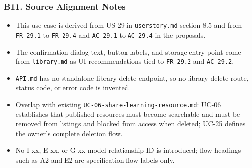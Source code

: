 \documentclass[12pt]{article}
\begin{document}
\hypertarget{sec:b11-source-alignment-notes}{}
\subsubsection*{B11. Source Alignment Notes}
\par\medskip

\begin{itemize}
\item This use case is derived from US-29 in \texttt{userstory.md} section 8.5 and from \texttt{FR-29.1} to \texttt{FR-29.4} and \texttt{AC-29.1} to \texttt{AC-29.4} in the proposals.
\item The confirmation dialog text, button labels, and storage entry point come from \texttt{library.md} as UI recommendations tied to \texttt{FR-29.2} and \texttt{AC-29.2}.
\item \texttt{API.md} has no standalone library delete endpoint, so no library delete route, status code, or error code is invented.
\item Overlap with existing \texttt{UC-06-share-learning-resource.md}: UC-06 establishes that published resources must become searchable and must be removed from listings and blocked from access when deleted; UC-25 defines the owner's complete deletion flow.
\item No I-xx, E-xx, or G-xx model relationship ID is introduced; flow headings such as A2 and E2 are specification flow labels only.
\end{itemize}
\par\medskip
\end{document}
